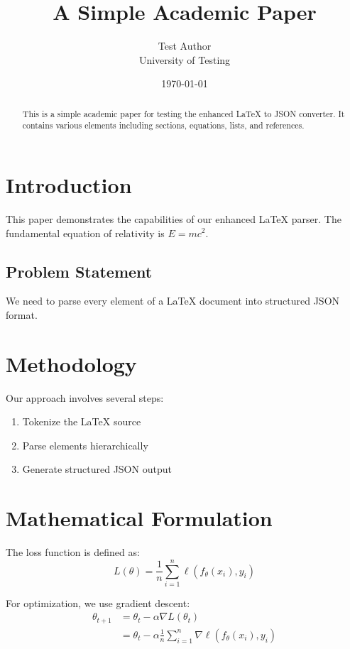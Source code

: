 \documentclass{article}
\title{A Simple Academic Paper}
\author{Test Author \\ University of Testing}
\date{\today}
\begin{document}
\maketitle

\begin{abstract}
This is a simple academic paper for testing the enhanced LaTeX to JSON converter.
It contains various elements including sections, equations, lists, and references.
\end{abstract}

\section{Introduction}
\label{sec:intro}

This paper demonstrates the capabilities of our enhanced LaTeX parser.
The fundamental equation of relativity is $E = mc^2$.

\subsection{Problem Statement}

We need to parse every element of a LaTeX document into structured JSON format.

\section{Methodology}

Our approach involves several steps:
\begin{enumerate}
\item Tokenize the LaTeX source
\item Parse elements hierarchically  
\item Generate structured JSON output
\end{enumerate}

\section{Mathematical Formulation}

The loss function is defined as:
\begin{equation}
\label{eq:loss}
L(\theta) = \frac{1}{n} \sum_{i=1}^{n} \ell(f_\theta(x_i), y_i)
\end{equation}

For optimization, we use gradient descent:
\begin{align}
\theta_{t+1} &= \theta_t - \alpha \nabla L(\theta_t) \\
&= \theta_t - \alpha \frac{1}{n} \sum_{i=1}^{n} \nabla \ell(f_\theta(x_i), y_i)
\end{align}
\end{document}
